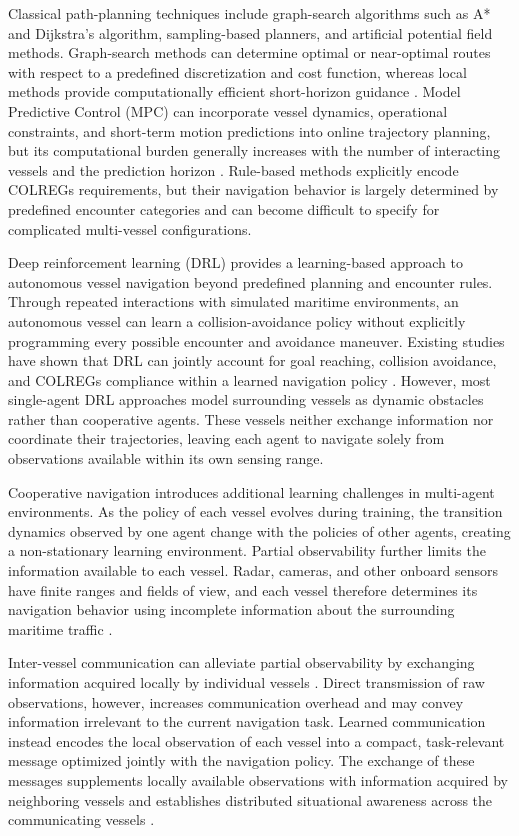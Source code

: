 \documentclass[final,5p,times,twocolumn]{elsarticle}
\begin{document}
{Classical path-planning techniques include graph-search algorithms such as A* and Dijkstra's algorithm, sampling-based planners, and artificial potential field methods. Graph-search methods can determine optimal or near-optimal routes with respect to a predefined discretization and cost function, whereas local methods provide computationally efficient short-horizon guidance \citep{Yuan,58}. Model Predictive Control (MPC) can incorporate vessel dynamics, operational constraints, and short-term motion predictions into online trajectory planning, but its computational burden generally increases with the number of interacting vessels and the prediction horizon \citep{Sarhadi}. Rule-based methods explicitly encode COLREGs requirements, but their navigation behavior is largely determined by predefined encounter categories and can become difficult to specify for complicated multi-vessel configurations.

Deep reinforcement learning (DRL) provides a learning-based approach to autonomous vessel navigation beyond predefined planning and encounter rules. Through repeated interactions with simulated maritime environments, an autonomous vessel can learn a collision-avoidance policy without explicitly programming every possible encounter and avoidance maneuver. Existing studies have shown that DRL can jointly account for goal reaching, collision avoidance, and COLREGs compliance within a learned navigation policy \citep{Zhao-COLREGs}. However, most single-agent DRL approaches model surrounding vessels as dynamic obstacles rather than cooperative agents. These vessels neither exchange information nor coordinate their trajectories, leaving each agent to navigate solely from observations available within its own sensing range.

Cooperative navigation introduces additional learning challenges in multi-agent environments. As the policy of each vessel evolves during training, the transition dynamics observed by one agent change with the policies of other agents, creating a non-stationary learning environment. Partial observability further limits the information available to each vessel. Radar, cameras, and other onboard sensors have finite ranges and fields of view, and each vessel therefore determines its navigation behavior using incomplete information about the surrounding maritime traffic \citep{Thombre}.

Inter-vessel communication can alleviate partial observability by exchanging information acquired locally by individual vessels \citep{Akdag,chen}. Direct transmission of raw observations, however, increases communication overhead and may convey information irrelevant to the current navigation task. Learned communication instead encodes the local observation of each vessel into a compact, task-relevant message optimized jointly with the navigation policy. The exchange of these messages supplements locally available observations with information acquired by neighboring vessels and establishes distributed situational awareness across the communicating vessels \citep{WangZhao2025}.

}
\end{document}
